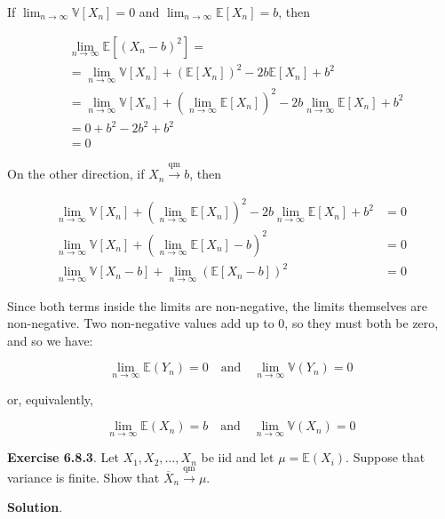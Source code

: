If \(\lim_{n \rightarrow \infty} \mathbb{V}[X_n] = 0\) and
\(\lim_{n \rightarrow \infty} \mathbb{E}[X_n] = b\), then

\begin{align}
& \lim_{n \rightarrow \infty} \mathbb{E}[(X_n - b)^2] = \\
& = \lim_{n \rightarrow \infty} \mathbb{V}[X_n] + (\mathbb{E}[X_n])^2 - 2b \mathbb{E}[X_n] + b^2 \\
& = \lim_{n \rightarrow \infty} \mathbb{V}[X_n] + (\lim_{n \rightarrow \infty} \mathbb{E}[X_n])^2 - 2b \lim_{n \rightarrow \infty} \mathbb{E}[X_n] + b^2 \\
&= 0 + b^2 - 2b^2 + b^2 \\
&= 0
\end{align}

On the other direction, if \(X_n \xrightarrow{\text{qm}} b\), then

\begin{align}
\lim_{n \rightarrow \infty} \mathbb{V}[X_n] + (\lim_{n \rightarrow \infty} \mathbb{E}[X_n])^2 - 2b \lim_{n \rightarrow \infty} \mathbb{E}[X_n] + b^2 &= 0 \\
\lim_{n \rightarrow \infty} \mathbb{V}[X_n] + (\lim_{n \rightarrow \infty} \mathbb{E}[X_n] - b)^2 &= 0 \\
\lim_{n \rightarrow \infty} \mathbb{V}[X_n - b] + \lim_{n \rightarrow \infty}  (\mathbb{E}[X_n - b])^2 &= 0
\end{align}

Since both terms inside the limits are non-negative, the limits
themselves are non-negative. Two non-negative values add up to 0, so
they must both be zero, and so we have:

\[
\begin{equation}
\lim_{n \rightarrow \infty} \mathbb{E}(Y_n) = 0
\quad\mathrm{and}\quad 
\lim_{n \rightarrow \infty} \mathbb{V}(Y_n) = 0
\end{equation}
\]

or, equivalently,

\[
\begin{equation}
\lim_{n \rightarrow \infty} \mathbb{E}(X_n) = b
\quad\mathrm{and}\quad 
\lim_{n \rightarrow \infty} \mathbb{V}(X_n) = 0
\end{equation}
\]

\textbf{Exercise 6.8.3}. Let \(X_1, X_2, \dots, X_n\) be iid and let
\(\mu = \mathbb{E}(X_i)\). Suppose that variance is finite. Show that
\(\overline{X}_n \xrightarrow{\text{qm}} \mu\).

\textbf{Solution}.

